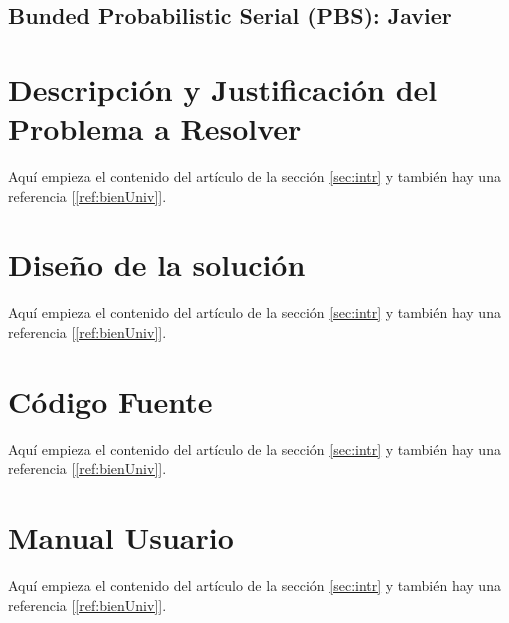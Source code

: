 \documentclass{article}
\begin{document}
\subsection{Bunded Probabilistic Serial (PBS): Javier}


\section{Descripción y Justificación del Problema a Resolver}\label{sec:descr}
Aquí empieza el contenido del artículo de la sección \ref{sec:intr} y también hay una referencia [\ref{ref:bienUniv}].


\section{Diseño de la solución}\label{sec:dis}
Aquí empieza el contenido del artículo de la sección \ref{sec:intr} y también hay una referencia [\ref{ref:bienUniv}].



\section{Código Fuente}\label{sec:cod}
Aquí empieza el contenido del artículo de la sección \ref{sec:intr} y también hay una referencia [\ref{ref:bienUniv}].



\section{Manual Usuario}\label{sec:man_u}
Aquí empieza el contenido del artículo de la sección \ref{sec:intr} y también hay una referencia [\ref{ref:bienUniv}].
\end{document}
